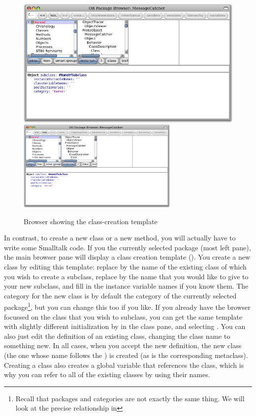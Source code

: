 \documentclass[a4paper,10pt,twoside]{book}
\begin{document}
\begin{figure}[htbp]
   \centering
   \ifluluelse
	   {\includegraphics[width=\textwidth]{SystemBrowserClassCreation}}
	   {\includegraphics[width=0.7\textwidth]{SystemBrowserClassCreation}}
   \caption{Browser showing the class-creation template
   }
\end{figure}

In contrast, to create a new class or a new method, you will actually
have to write some Smalltalk code.  If you \click the currently
selected package (most left pane), the main
browser pane will display a class creation template
().  You create a new class by
editing this template: replace  by the name of the existing
class of which you wish to create a subclass, replace
 by the name that you would like to give to your
new subclass, and fill in the instance variable names if you know
them.  The category for the new class is by default the category of the currently
selected package\footnote{Recall that packages and categories are not exactly the same thing. We will look at the precise relationship in }, but you can change this too if you like.  If you
already have the browser focussed on the class that you wish to
subclass, you can get the same template with slightly different
initialization by  in the class pane, and
selecting .  You can also just
edit the definition of an existing class, changing the class name to
something new.  In all cases, when you accept the new definition, the
new class (the one whose name follows the \ct{#}) is created (as is
the corresponding metaclass).  Creating a class also creates a global
variable that references the class, which is why you can refer to all
of the existing classes by using their names.  
\end{document}
